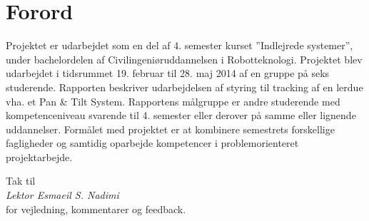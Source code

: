 \section*{Forord}
Projektet er udarbejdet som en del af 4. semester kurset ”Indlejrede systemer”, under bachelordelen af Civilingeniøruddannelsen i Robotteknologi. 
Projektet blev udarbejdet i tidsrummet 19. februar til 28. maj 2014 af en gruppe på seks studerende.
Rapporten beskriver udarbejdelsen af styring til tracking af en lerdue vha. et Pan \& Tilt System.
Rapportens målgruppe er andre studerende med kompetenceniveau svarende til 4. semester eller derover på samme eller lignende uddannelser.
Formålet med projektet er at kombinere semestrets forskellige fagligheder og samtidig oparbejde kompetencer i problemorienteret projektarbejde.
\bigskip
\begin{center}
Tak til \\
\textit{Lektor Esmaeil S. Nadimi} \\ 
for vejledning, kommentarer og feedback.
\end{center}





